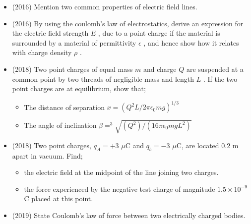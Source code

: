 \documentclass{article}
\begin{document}
\begin{itemize}
\item (2016)  Mention two common properties of electric field lines.
\item (2016)  By using the coulomb’s law of electrostatics, derive an expression for the electric field strength $ E$ , due to a point charge if the material is surrounded by a material of permittivity $ \epsilon $ , and hence show how it relates with charge density $ \rho $ .
\item (2018)  Two point charges of equal mass $ m$ and charge $ Q$ are suspended at a common point by two threads of negligible mass and length $ L$ . If the two point charges are at equilibrium,  show that;
 \begin{itemize}
\item The distance of separation $ x=({Q^{2}L}/{2\pi\epsilon _{0}mg})^{1/3}$
\item The angle of inclination $ \beta = ^{3}\sqrt{(Q^{2})/(16\pi\epsilon _{0}mgL^{2})}$ 
\end{itemize}
\item (2018)  Two point charges, $ q_{A}=+3$ $\mu$C and $ q_{b}=-3$ $\mu$C, are located $ 0.2$ m apart in vacuum. Find; 
 \begin{itemize}
\item the electric field at the midpoint of the line joining two charges. 
\item the force experienced by the negative test charge of magnitude $ 1.5 \times 10^{-9}$ C placed at this point.
\end{itemize}
\item (2019)  State Coulomb’s law of force between two electrically charged bodies. 
\end{itemize}
\end{document}

